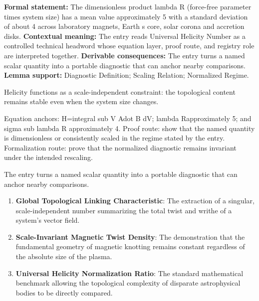 \begingroup\footnotesize\setlength{\emergencystretch}{3em}\sloppy
\textbf{Formal statement:} The dimensionless product lambda R (force-free parameter times system size) has a mean value approximately 5 with a standard deviation of about 4 across laboratory magnets, Earth s core, solar corona and accretion disks. \textbf{Contextual meaning:} The entry reads Universal Helicity Number as a controlled technical headword whose equation layer, proof route, and registry role are interpreted together. \textbf{Derivable consequences:} The entry turns a named scalar quantity into a portable diagnostic that can anchor nearby comparisons. \textbf{Lemma support:} Diagnostic Definition; Scaling Relation; Normalized Regime.\par
\endgroup

Helicity functions as a scale-independent constraint: the topological content remains stable even when the system size changes.

Equation anchors: H=integral sub V Adot B dV; lambda Rapproximately 5; and sigma sub lambda R approximately 4. Proof route: show that the named quantity is dimensionless or consistently scaled in the regime stated by the entry. Formalization route: prove that the normalized diagnostic remains invariant under the intended rescaling.

The entry turns a named scalar quantity into a portable diagnostic that can anchor nearby comparisons.
\endgroup

\begin{enumerate}[leftmargin=1.6em,itemsep=6pt,topsep=4pt]
\item \textbf{Global Topological Linking Characteristic}: The extraction of a singular, scale-independent number summarizing the total twist and writhe of a system's vector field.
\item \textbf{Scale-Invariant Magnetic Twist Density}: The demonstration that the fundamental geometry of magnetic knotting remains constant regardless of the absolute size of the plasma.
\item \textbf{Universal Helicity Normalization Ratio}: The standard mathematical benchmark allowing the topological complexity of disparate astrophysical bodies to be directly compared.
\end{enumerate}

